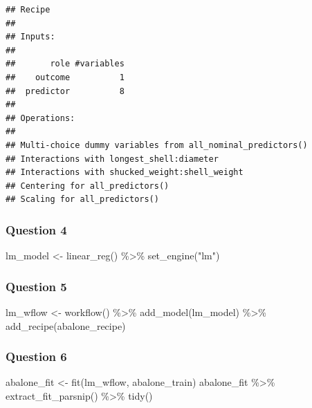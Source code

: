 \documentclass[
]{article}
\newenvironment{Shaded}{\begin{snugshade}}{\end{snugshade}}
\newcommand{\FunctionTok}[1]{\textcolor[rgb]{0.00,0.00,0.00}{#1}}
\newcommand{\NormalTok}[1]{#1}
\newcommand{\OtherTok}[1]{\textcolor[rgb]{0.56,0.35,0.01}{#1}}
\newcommand{\SpecialCharTok}[1]{\textcolor[rgb]{0.00,0.00,0.00}{#1}}
\newcommand{\StringTok}[1]{\textcolor[rgb]{0.31,0.60,0.02}{#1}}
\begin{document}
\begin{verbatim}
## Recipe
## 
## Inputs:
## 
##       role #variables
##    outcome          1
##  predictor          8
## 
## Operations:
## 
## Multi-choice dummy variables from all_nominal_predictors()
## Interactions with longest_shell:diameter
## Interactions with shucked_weight:shell_weight
## Centering for all_predictors()
## Scaling for all_predictors()
\end{verbatim}

\hypertarget{question-4}{%
\subsubsection{Question 4}\label{question-4}}

\begin{Shaded}
\begin{Highlighting}[]
\NormalTok{lm\_model }\OtherTok{\textless{}{-}} \FunctionTok{linear\_reg}\NormalTok{() }\SpecialCharTok{\%\textgreater{}\%} 
  \FunctionTok{set\_engine}\NormalTok{(}\StringTok{"lm"}\NormalTok{)}
\end{Highlighting}
\end{Shaded}

\hypertarget{question-5}{%
\subsubsection{Question 5}\label{question-5}}

\begin{Shaded}
\begin{Highlighting}[]
\NormalTok{lm\_wflow }\OtherTok{\textless{}{-}} \FunctionTok{workflow}\NormalTok{() }\SpecialCharTok{\%\textgreater{}\%} 
  \FunctionTok{add\_model}\NormalTok{(lm\_model) }\SpecialCharTok{\%\textgreater{}\%} 
  \FunctionTok{add\_recipe}\NormalTok{(abalone\_recipe)}
\end{Highlighting}
\end{Shaded}

\hypertarget{question-6}{%
\subsubsection{Question 6}\label{question-6}}

\begin{Shaded}
\begin{Highlighting}[]
\NormalTok{abalone\_fit }\OtherTok{\textless{}{-}} \FunctionTok{fit}\NormalTok{(lm\_wflow, abalone\_train)}
\NormalTok{abalone\_fit }\SpecialCharTok{\%\textgreater{}\%} \FunctionTok{extract\_fit\_parsnip}\NormalTok{() }\SpecialCharTok{\%\textgreater{}\%} \FunctionTok{tidy}\NormalTok{()}
\end{Highlighting}
\end{Shaded}
\end{document}
